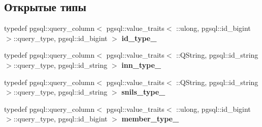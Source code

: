 \subsection*{Открытые типы}
\begin{DoxyCompactItemize}
\item 
typedef pgsql\+::query\+\_\+column$<$ pgsql\+::value\+\_\+traits$<$ \+::ulong, pgsql\+::id\+\_\+bigint $>$\+::query\+\_\+type, pgsql\+::id\+\_\+bigint $>$ {\bfseries id\+\_\+type\+\_\+}\hypertarget{structodb_1_1pointer__query__columns_3_01_1_1kpk_1_1data_1_1_person_00_01id__pgsql_00_01_a_01_4_a0375840983484c33665c739a717a4d6e}{}\label{structodb_1_1pointer__query__columns_3_01_1_1kpk_1_1data_1_1_person_00_01id__pgsql_00_01_a_01_4_a0375840983484c33665c739a717a4d6e}

\item 
typedef pgsql\+::query\+\_\+column$<$ pgsql\+::value\+\_\+traits$<$ \+::Q\+String, pgsql\+::id\+\_\+string $>$\+::query\+\_\+type, pgsql\+::id\+\_\+string $>$ {\bfseries inn\+\_\+type\+\_\+}\hypertarget{structodb_1_1pointer__query__columns_3_01_1_1kpk_1_1data_1_1_person_00_01id__pgsql_00_01_a_01_4_a1ed7972b58689dd096e090f7f7db2afe}{}\label{structodb_1_1pointer__query__columns_3_01_1_1kpk_1_1data_1_1_person_00_01id__pgsql_00_01_a_01_4_a1ed7972b58689dd096e090f7f7db2afe}

\item 
typedef pgsql\+::query\+\_\+column$<$ pgsql\+::value\+\_\+traits$<$ \+::Q\+String, pgsql\+::id\+\_\+string $>$\+::query\+\_\+type, pgsql\+::id\+\_\+string $>$ {\bfseries snils\+\_\+type\+\_\+}\hypertarget{structodb_1_1pointer__query__columns_3_01_1_1kpk_1_1data_1_1_person_00_01id__pgsql_00_01_a_01_4_a2bd94d9773c1b22807dc9121e9f7acb7}{}\label{structodb_1_1pointer__query__columns_3_01_1_1kpk_1_1data_1_1_person_00_01id__pgsql_00_01_a_01_4_a2bd94d9773c1b22807dc9121e9f7acb7}

\item 
typedef pgsql\+::query\+\_\+column$<$ pgsql\+::value\+\_\+traits$<$ \+::ulong, pgsql\+::id\+\_\+bigint $>$\+::query\+\_\+type, pgsql\+::id\+\_\+bigint $>$ {\bfseries member\+\_\+type\+\_\+}\hypertarget{structodb_1_1pointer__query__columns_3_01_1_1kpk_1_1data_1_1_person_00_01id__pgsql_00_01_a_01_4_ad0d7c9cd1313e7319c17ae966defcdbc}{}\label{structodb_1_1pointer__query__columns_3_01_1_1kpk_1_1data_1_1_person_00_01id__pgsql_00_01_a_01_4_ad0d7c9cd1313e7319c17ae966defcdbc}

\end{DoxyCompactItemize}
